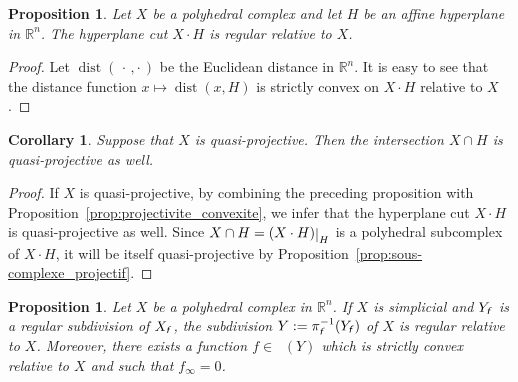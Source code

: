 \documentclass[11pt]{amsart}
\newtheorem{prop}[thm]{Proposition}
\newtheorem{cor}[thm]{Corollary}
\theoremstyle{definition}
\numberwithin{equation}{section}
\renewcommand{\~}{\widetilde}
\newcommand{\R}{\mathbb{R}}
\newcommand{\rest}[1]{\raisebox{-1pt}{$\vert$}_{#1}}
\newcommand{\ccdot}{\,\cdot\,}
\newcommand{\rdot}{\cdot\,}
\DeclareMathOperator{\dist}{dist} %
\newcommand{\f}{{\textnormal{\textsl{\textsf f}}}} %
\DeclareMathOperator{\lpm}{\mathcal L^{pm}} %
\begin{document}
\begin{prop} \label{prop:coupe_projective}
Let $X$ be a polyhedral complex and let $H$ be an affine hyperplane in $\R^n$. The hyperplane cut $X\cdot H$ is regular relative to $X$.
\end{prop}

\begin{proof} Let $\dist(\ccdot,\rdot)$ be the Euclidean distance in $\R^n$. It is easy to see that the distance function $x\mapsto \dist(x, H)$ is strictly convex on $X\cdot H$ relative to $X$.
\end{proof}

\begin{cor} \label{prop:intersection_projective}
Suppose that $X$ is quasi-projective. Then the intersection $X\cap H$ is quasi-projective as well.
\end{cor}

\begin{proof} If $X$ is quasi-projective, by combining the preceding proposition with Proposition~\ref{prop:projectivite_convexite}, we infer that the hyperplane cut $X\cdot H$ is quasi-projective as well. Since $X\cap H=(X\cdot H)\rest H$ is a polyhedral subcomplex of $X\cdot H$, it will be itself quasi-projective by Proposition~\ref{prop:sous-complexe_projectif}.
\end{proof}

\begin{prop} \label{prop:extension_projectivite_partie_finie}
Let $X$ be a polyhedral complex in $\R^n$. If $X$ is simplicial and $Y_\f$ is a regular subdivision of $X_\f$, the subdivision $Y:=\pi_\f^{-1}(Y_\f)$ of $X$ is regular relative to $X$. Moreover, there exists a function $f\in\lpm(Y)$ which is strictly convex relative to $X$ and such that $f_\infty=0$.
\end{prop}
\end{document}
